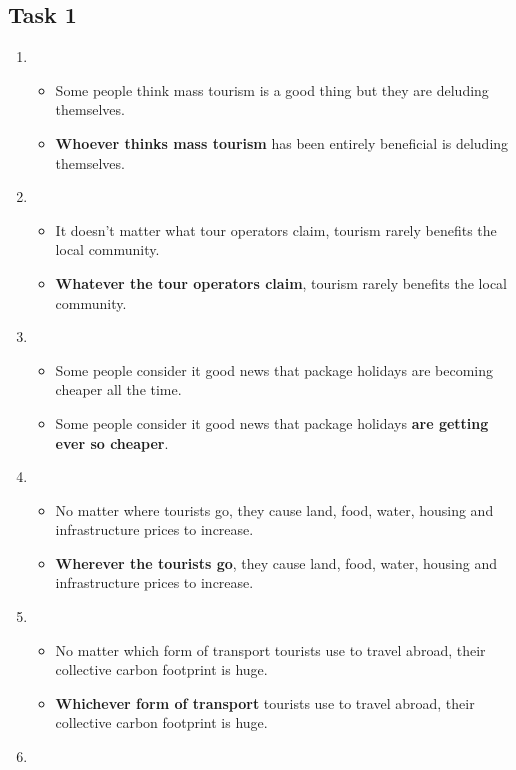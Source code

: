 \documentclass[a4paper]{article}
\begin{document}
\subsection*{Task 1}
\begin{enumerate}
    \item \begin{itemize}
        \item Some people think mass tourism is a good thing but they are deluding themselves.
        \item \textbf{Whoever thinks mass tourism} has been entirely beneficial is deluding themselves.
    \end{itemize}
    \item \begin{itemize}
        \item It doesn't matter what tour operators claim, tourism rarely benefits the local community.
        \item \textbf{Whatever the tour operators claim}, tourism rarely benefits the local community.
    \end{itemize}
    \item \begin{itemize}
        \item Some people consider it good news that package holidays are becoming cheaper all the time.
        \item Some people consider it good news that package holidays \textbf{are getting ever so cheaper}.
    \end{itemize}
    \item \begin{itemize}
        \item No matter where tourists go, they cause land, food, water, housing and infrastructure prices to increase.
        \item \textbf{Wherever the tourists go}, they cause land, food, water, housing and infrastructure prices to increase.
    \end{itemize}
    \item \begin{itemize}
        \item No matter which form of transport tourists use to travel abroad, their collective carbon footprint is huge.
        \item \textbf{Whichever form of transport} tourists use to travel abroad, their collective carbon footprint is huge.
    \end{itemize}
    \item \begin{enumerate}

\end{enumerate}
\end{enumerate}
\end{document}
